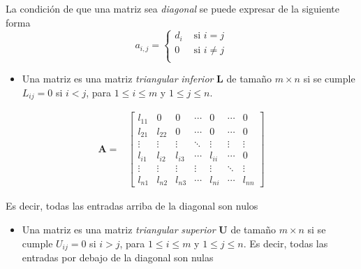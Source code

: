 \documentclass[
]{article}
\providecommand{\tightlist}{%
  \setlength{\itemsep}{0pt}\setlength{\parskip}{0pt}}
\begin{document}
La condición de que una matriz sea \emph{diagonal} se puede expresar de
la siguiente forma \[
a_{i,j}=\begin{cases} 
                  d_i   &    \mbox{ si }i = j\\
                  0     &    \mbox{ si }i\ne j\\
        \end{cases}
\]

\begin{itemize}
\tightlist
\item
  Una matriz es una matriz \emph{triangular} \emph{inferior}
  \(\mathbf{L}\) de tamaño \(m\times n\) si se cumple \(L_{ij}=0\) si
  \(i<j\), para \(1\leq i\leq m\) y \(1\leq j\leq n\).
\end{itemize}

\begin{equation}
\begin{array}{cc}
\mathbf{A}  =&  \begin{bmatrix}
        l_{11}  & 0      & 0       & \cdots &  0       & \cdots & 0      \\
        l_{21}  & l_{22} & 0       & \cdots &  0       & \cdots & 0      \\
        \vdots  & \vdots & \vdots  & \ddots &  \vdots  & \vdots & \vdots \\
        l_{i1}  & l_{i2} & l_{i3}  & \cdots &  l_{ii}  & \cdots & 0 \\
        \vdots  & \vdots & \vdots  & \vdots &  \vdots  & \ddots & \vdots \\
        l_{n1}  & l_{n2} & l_{n3}  & \cdots &  l_{ni}  & \cdots & l_{nn} 
  \end{bmatrix}
\end{array}
\end{equation}

Es decir, todas las entradas arriba de la diagonal son nulos

\begin{itemize}
\tightlist
\item
  Una matriz es una matriz \emph{triangular} \emph{superior}
  \(\mathbf{U}\) de tamaño \(m\times n\) si se cumple \(U_{ij}=0\) si
  \(i>j\), para \(1\leq i\leq m\) y \(1\leq j\leq n\). Es decir, todas
  las entradas por debajo de la diagonal son nulas
\end{itemize}
\end{document}
